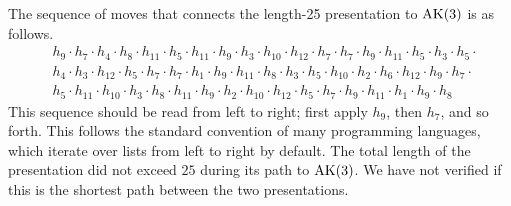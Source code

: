 The sequence of moves that connects the length-25 presentation to $\text{AK}(3)$ is as follows. 
\[
\begin{aligned}
& h_9 \cdot h_7 \cdot h_4 \cdot h_8 \cdot h_{11} \cdot h_5 \cdot h_{11} \cdot h_9 \cdot h_3 \cdot h_{10} \cdot h_{12} \cdot h_7 \cdot h_7 \cdot h_9 \cdot h_{11} \cdot h_5 \cdot h_3 \cdot h_5 \cdot \\
& h_4 \cdot h_3 \cdot h_{12} \cdot h_5 \cdot h_7 \cdot h_7 \cdot h_1 \cdot h_9 \cdot h_{11} \cdot h_8 \cdot h_3 \cdot h_5 \cdot h_{10} \cdot h_2 \cdot h_6 \cdot h_{12} \cdot h_9 \cdot h_7 \cdot \\
& h_5 \cdot h_{11} \cdot h_{10} \cdot h_3 \cdot h_8 \cdot h_{11} \cdot h_9 \cdot h_2 \cdot h_{10} \cdot h_{12} \cdot h_5 \cdot h_7 \cdot h_9 \cdot h_{11} \cdot h_1 \cdot h_9 \cdot h_8
\end{aligned}
\]
This sequence should be read from left to right; first apply $h_9$, then $h_7$, and so forth. This follows the standard convention of many programming languages, which iterate over lists from left to right by default. The total length of the presentation did not exceed $25$ during its path to $\text{AK}(3)$. We have not verified if this is the shortest path between the two presentations.




